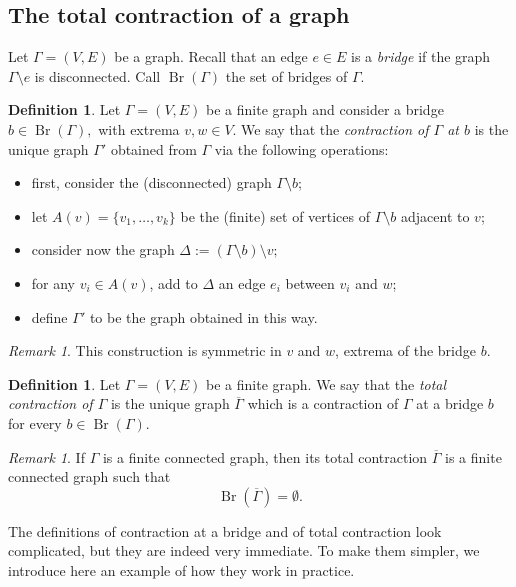 \documentclass[a4paper,12 pt,titlepage,twoside]{book}
\DeclareMathOperator{\br}{Br}
\theoremstyle{plain}
\theoremstyle{theorem}
\theoremstyle{definition}
\newtheorem{defn}[thm]{Definition}
\theoremstyle{remark}
\newtheorem{oss}[thm]{Remark}
\begin{document}
	\subsection{The total contraction of a graph}
	Let $\Gamma = (V,E)$ be a graph. Recall that an edge $e \in E$ is a \emph{bridge} if the graph $\Gamma \setminus e$ is disconnected. Call $\br(\Gamma)$ the set of bridges of $\Gamma.$
	\begin{defn}
		Let $\Gamma=(V,E)$ be a finite graph and consider a bridge $b \in \br(\Gamma),$ with extrema $v,w \in V$. We say that the \emph{contraction of $\Gamma$ at $b$} is the unique graph $\Gamma'$ obtained from $\Gamma$ via the following operations:
		\begin{itemize}
			\item first, consider the (disconnected) graph $\Gamma \setminus b$;
			\item let $A(v)= \{v_1, \dots, v_k\}$ be the (finite) set of vertices of $\Gamma \setminus b$ adjacent to $v$;
			\item consider now the graph $\Delta:= (\Gamma \setminus b) \setminus v;$
			\item for any $v_i \in A(v)$, add to $\Delta$ an edge $e_i$ between $v_i$ and $w$;
			\item define $\Gamma'$ to be the graph obtained in this way.
		\end{itemize}
	\end{defn}
	\begin{oss}
		This construction is symmetric in $v$ and $w$, extrema of the bridge $b$.
	\end{oss}
	\begin{defn}
		Let $\Gamma =(V,E)$ be a finite graph. We say that the \emph{total contraction of $\Gamma$} is the unique graph $\overline{\Gamma}$ which is a contraction of $\Gamma$ at a bridge $b$ for every $b \in \br(\Gamma)$.
	\end{defn}
	\begin{oss}
		If $\Gamma$ is a finite connected graph, then its total contraction $\overline{\Gamma}$ is a finite connected graph such that $$\br(\overline{\Gamma}) = \emptyset.$$
	\end{oss}
	The definitions of contraction at a bridge and of total contraction look complicated, but they are indeed very immediate. To make them simpler, we introduce here an example of how they work in practice.
\end{document}
